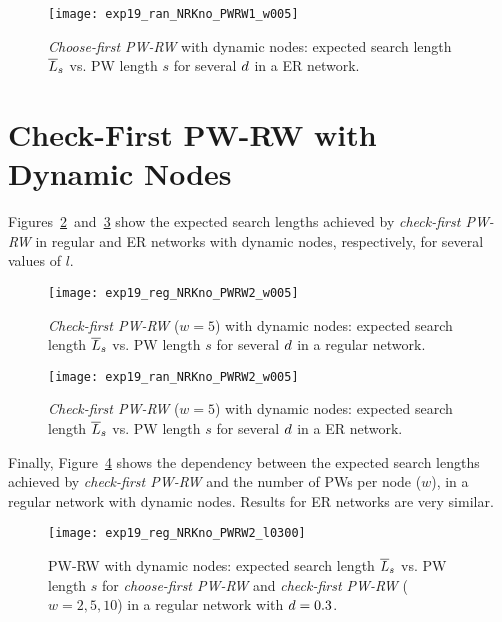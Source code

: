 \documentclass[]{elsarticle}
\newcommand{\s}		{\ensuremath{s}}		\newcommand{\sopt}	{\ensuremath{s_{opt}}}		\newcommand{\p}		{\ensuremath{p}}		\newcommand{\W}		{\ensuremath{W}}		\newcommand{\w}		{\ensuremath{w}}		\newcommand{\lsave}	{\ensuremath{\overline{l}_s}}	\newcommand{\lave}	{\ensuremath{\overline{l}}}	\newcommand{\lopt}	{\ensuremath{\overline{l}_{opt}}}
\begin{document}
\begin{figure}[h]
 \centering
 \texttt{[image: exp19\_ran\_NRKno\_PWRW1\_w005]}
 \caption{\emph{Choose-first PW-RW} with dynamic nodes: expected search length $\overline{L}_s$ vs. PW length $\s$ for several $d$ in a ER network.}
 \label{fig:random_pw1_dynnodes}
\end{figure}

\section{Check-First PW-RW with Dynamic Nodes}

Figures~\ref{fig:regular_pw2_dynnodes}~and~\ref{fig:random_pw2_dynnodes} show the expected search lengths achieved by \emph{check-first PW-RW} in regular and ER networks with dynamic nodes, respectively, for several values of $l$.


\begin{figure}[h]
 \centering
 \texttt{[image: exp19\_reg\_NRKno\_PWRW2\_w005]}
 \caption{\emph{Check-first PW-RW} ($\w=5$) with dynamic nodes: expected search length $\overline{L}_s$ vs. PW length $\s$ for several $d$ in a regular network.}
 \label{fig:regular_pw2_dynnodes}
\end{figure}

\begin{figure}[h]
 \centering
 \texttt{[image: exp19\_ran\_NRKno\_PWRW2\_w005]}
 \caption{\emph{Check-first PW-RW} ($\w=5$) with dynamic nodes: expected search length $\overline{L}_s$ vs. PW length $\s$ for several $d$ in a ER network.}
 \label{fig:random_pw2_dynnodes}
\end{figure}

Finally, Figure~\ref{fig:regular_pw1_pw2_dynnodes} shows the dependency between the expected search lengths achieved by \emph{check-first PW-RW} and the number of PWs per node ($w$), in a regular network with dynamic nodes. Results for ER networks are very similar.


\begin{figure}[h]
 \centering
 \texttt{[image: exp19\_reg\_NRKno\_PWRW2\_l0300]}
 \caption{PW-RW with dynamic nodes: expected search length $\overline{L}_s$ vs. PW length $\s$ for \emph{choose-first PW-RW} and \emph{check-first PW-RW} ($\w = 2, 5, 10$) in a regular network with $d=0.3$.}
 \label{fig:regular_pw1_pw2_dynnodes}
\end{figure}
\end{document}
